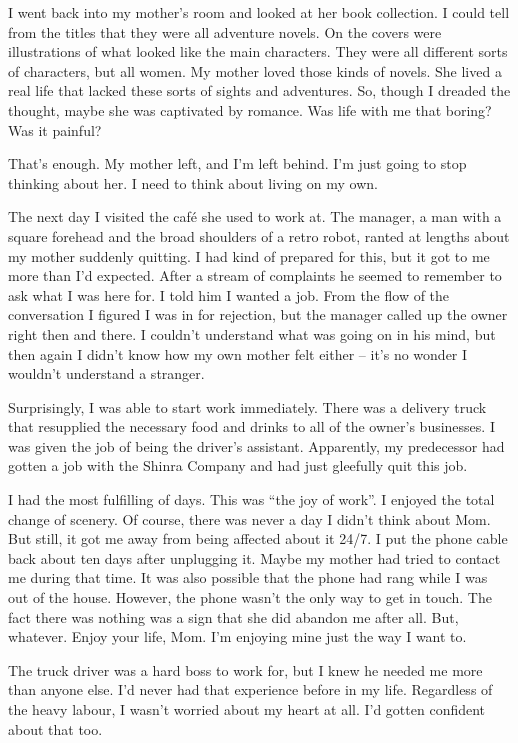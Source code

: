 \documentclass[oneside]{book}
\begin{document}
I went back into my mother’s room and looked at her book collection. I could tell from the titles that they were all adventure novels. On the covers were illustrations of what looked like the main characters. They were all different sorts of characters, but all women. My mother loved those kinds of novels. She lived a real life that lacked these sorts of sights and adventures. So, though I dreaded the thought, maybe she was captivated by romance. Was life with me that boring? Was it painful?

That’s enough. My mother left, and I’m left behind. I’m just going to stop thinking about her. I need to think about living on my own.

The next day I visited the café she used to work at. The manager, a man with a square forehead and the broad shoulders of a retro robot, ranted at lengths about my mother suddenly quitting. I had kind of prepared for this, but it got to me more than I’d expected. After a stream of complaints he seemed to remember to ask what I was here for. I told him I wanted a job. From the flow of the conversation I figured I was in for rejection, but the manager called up the owner right then and there. I couldn’t understand what was going on in his mind, but then again I didn’t know how my own mother felt either – it’s no wonder I wouldn’t understand a stranger.

Surprisingly, I was able to start work immediately. There was a delivery truck that resupplied the necessary food and drinks to all of the owner’s businesses. I was given the job of being the driver’s assistant. Apparently, my predecessor had gotten a job with the Shinra Company and had just gleefully quit this job.

I had the most fulfilling of days. This was “the joy of work”. I enjoyed the total change of scenery. Of course, there was never a day I didn’t think about Mom. But still, it got me away from being affected about it 24/7. I put the phone cable back about ten days after unplugging it. Maybe my mother had tried to contact me during that time. It was also possible that the phone had rang while I was out of the house. However, the phone wasn’t the only way to get in touch. The fact there was nothing was a sign that she did abandon me after all. But, whatever. Enjoy your life, Mom. I’m enjoying mine just the way I want to.

The truck driver was a hard boss to work for, but I knew he needed me more than anyone else. I’d never had that experience before in my life. Regardless of the heavy labour, I wasn’t worried about my heart at all. I’d gotten confident about that too.
\end{document}
